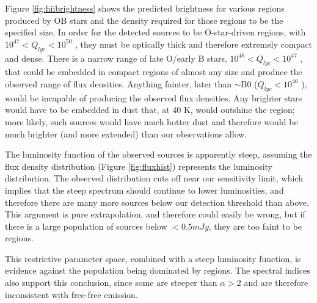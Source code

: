 \documentclass[twocolumn]{aastex61}
\begin{document}
Figure \ref{fig:hiibrightness} shows the predicted brightness for various \hii
regions produced by OB stars and the density required for those \hii regions
to be the specified size.  In
order for the detected sources to be O-star-driven \hii regions, with $10^{47}
< Q_{lyc} < 10^{50}$ \pers, they must be optically thick and therefore
extremely compact and dense.  There is a narrow range of late O/early B stars,
$10^{46} < Q_{lyc} < 10^{47}$ \pers, that could be embedded in compact \hii
regions of almost any size and produce the observed range of flux densities.
Anything fainter, later than $\sim$B0 ($Q_{lyc}<10^{46}$ \pers), would be
incapable of producing the observed flux densities.
Any brighter stars would have to be embedded in dust that, at 40 K, would
outshine the \hii region; more likely, such sources would have much hotter dust
and therefore would be much brighter (and more extended) than our observations
allow.

The luminosity function of the observed sources is apparently steep, assuming
the flux density distribution (Figure \ref{fig:fluxhist}) represents the
luminosity distribution.  The observed distribution cuts off near our
sensitivity limit, which implies that the steep spectrum should continue to
lower luminosities, and therefore there are many more sources below our
detection threshold than above.  This argument is pure extrapolation, and
therefore could easily be wrong, but if there is a large population of sources
below $<0.5 mJy$, they are too faint to be \hii regions.

This restrictive parameter space, combined with a steep luminosity function, is
evidence against the population being dominated by \hii regions.  The spectral
indices also support this conclusion, since some are steeper than $\alpha>2$
and are therefore inconsistent with free-free emission.
\end{document}
